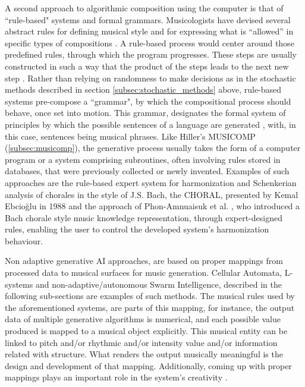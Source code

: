         A second approach to algorithmic composition using the computer is that of ``rule-based" systems and formal grammars. Musicologists have devised several abstract rules for defining musical style and for expressing what is ``allowed” in specific types of compositions \cite{maxim_kal_pap_book}. A rule-based process would center around those predefined rules, through which the program progresses. These steps are usually constructed in such a way that the product of the steps leads to the next new step \cite{burns1997algorithmic}. Rather than relying on randomness to make decisions as in the stochastic methods described in section \ref{subsec:stochastic_methods} above, rule-based systems pre-compose a ``grammar", by which the compositional process should behave, once set into motion.  This grammar, designates the formal system of principles by which the possible sentences of a language are generated \cite{burns1997algorithmic}, with, in this case, sentences being musical phrases. Like Hiller's MUSICOMP (\ref{subsec:musicomp}), the generative process usually takes the form of a computer program or a system comprising subroutines, often involving rules stored in databases, that were previously collected or newly invented. Examples of such approaches are the rule-based expert system for harmonization and Schenkerian analysis of chorales in the style of J.S. Bach, the CHORAL, presented by Kemal Ebcioğlu in 1988 \cite{choral_bach} and the approach of Phon-Amnuaisuk et al. \cite{phon2006chorale, Phon_bach_2002}, who introduced a Bach chorale style music knowledge representation, through expert-designed rules, enabling the user to control the developed system's harmonization behaviour.


        Non adaptive generative AI approaches, are based on proper mappings from processed data to musical surfaces for music generation. Cellular Automata, L-systems and non-adaptive/autonomous Swarm Intelligence, described in the following sub-sections are examples of such methods. The musical rules used by the aforementioned systems, are parts of this mapping, for instance, the output data of multiple generative algorithms is numerical, and each possible value produced is mapped to a musical object explicitly. This musical entity can be linked to pitch and/or rhythmic and/or intensity value and/or information related with structure. What renders the output musically meaningful is the design and development of that mapping. Additionally, coming up with proper mappings plays an important role in the system's creativity \cite{maxim_kal_pap_book}.


